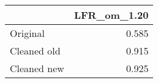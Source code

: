 \begin{tabular}{lr}
\toprule
{} & LFR_om_1.20 \\
\midrule
Original    &       0.585 \\
Cleaned old &       0.915 \\
Cleaned new &       0.925 \\
\bottomrule
\end{tabular}
